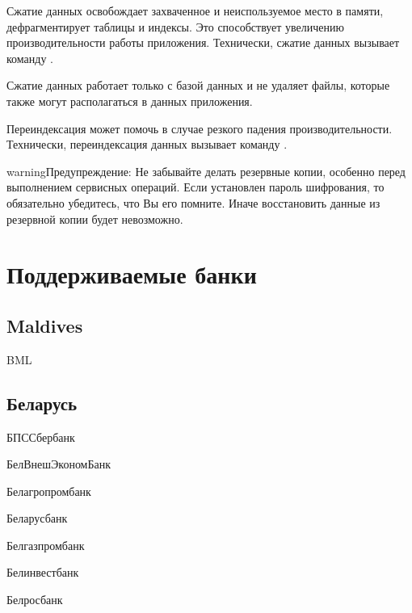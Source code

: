\documentclass[a4paper,10pt,russian]{sphinxmanual}
\begin{document}
\sphinxAtStartPar
Сжатие данных освобождает захваченное и неиспользуемое место в памяти, дефрагментирует таблицы и индексы.
Это способствует увеличению производительности работы приложения. Технически, сжатие данных вызывает команду .

\sphinxAtStartPar
Сжатие данных работает только с базой данных и не удаляет файлы, которые также могут располагаться в данных приложения.

\sphinxAtStartPar
Переиндексация может помочь в случае резкого падения производительности. Технически, переиндексация данных вызывает
команду .

\begin{sphinxadmonition}{warning}{Предупреждение:}
\sphinxAtStartPar
Не забывайте делать резервные копии, особенно перед выполнением сервисных операций. Если установлен пароль шифрования, то обязательно убедитесь, что Вы его помните. Иначе восстановить данные из резервной копии будет невозможно.
\end{sphinxadmonition}

\sphinxstepscope


\chapter{Поддерживаемые банки}
\label{\detokenize{banks:chapter-supported-banks}}\label{\detokenize{banks:id1}}\label{\detokenize{banks::doc}}

\section{Maldives}
\label{\detokenize{banks:maldives}}
\sphinxAtStartPar
BML


\section{Беларусь}
\label{\detokenize{banks:id2}}
\sphinxAtStartPar
БПС\sphinxhyphen{}Сбербанк

\sphinxAtStartPar
БелВнешЭкономБанк

\sphinxAtStartPar
Белагропромбанк

\sphinxAtStartPar
Беларусбанк

\sphinxAtStartPar
Белгазпромбанк

\sphinxAtStartPar
Белинвестбанк

\sphinxAtStartPar
Белросбанк
\end{document}
